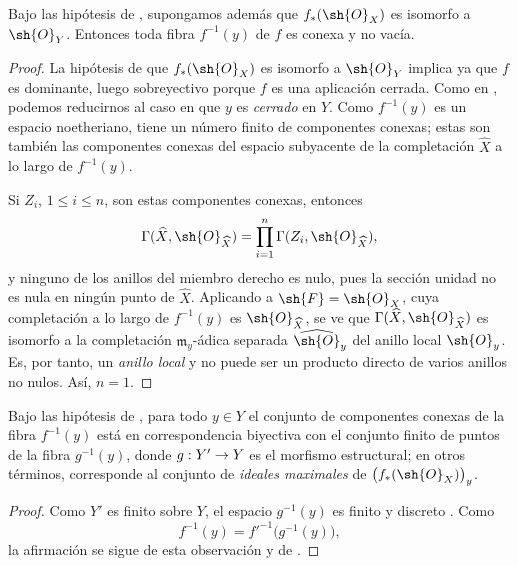 \documentclass[oneside]{amsart}
\makeatletter
\renewcommand{\leq}{\leqslant}
\newcommand{\ega@arrow}[2]{\mathchoice{#1}{#2}{#2}{#2}}
\renewcommand{\to}{\ega@arrow{\longrightarrow}{\rightarrow}}
\let\EGAOriginalLabel\label
\renewcommand{\label}[1]{\phantomsection\EGAOriginalLabel{#1}}
\makeatother
\begin{document}
\begin{corollary}[4.3.2]
\label{III.4.3.2}
Bajo las hipótesis de \textup{}, supongamos además que
$f_*(\sh{O}_X)$ es isomorfo a $\sh{O}_Y$. Entonces toda fibra
$f^{-1}(y)$ de $f$ es conexa y no vacía.
\end{corollary}

\begin{proof}
La hipótesis de que $f_*(\sh{O}_X)$ es isomorfo a $\sh{O}_Y$ implica
ya que $f$ es dominante, luego sobreyectivo porque $f$ es una
aplicación cerrada. Como en , podemos reducirnos al
caso en que $y$ es \emph{cerrado} en $Y$. Como $f^{-1}(y)$ es un espacio
noetheriano, tiene un número finito de componentes conexas; estas son
también las componentes conexas del espacio subyacente de la
completación $\widehat{X}$ a lo largo de $f^{-1}(y)$.

Si $Z_i$, $1\leq i\leq n$, son estas componentes conexas, entonces
\[
  \Gamma(\widehat{X},\sh{O}_{\widehat{X}})
  =
  \prod_{i=1}^{n}\Gamma(Z_i,\sh{O}_{\widehat{X}}),
\]
y ninguno de los anillos del miembro derecho es nulo, pues la sección
unidad no es nula en ningún punto de $\widehat{X}$. Aplicando
 a $\sh{F}=\sh{O}_X$, cuya completación a lo largo de
$f^{-1}(y)$ es $\sh{O}_{\widehat{X}}$, se ve que
$\Gamma(\widehat{X},\sh{O}_{\widehat{X}})$ es isomorfo a la
completación $\mathfrak{m}_y$-ádica separada
$\widehat{\sh{O}}_y$ del anillo local $\sh{O}_y$. Es, por tanto, un
\emph{anillo local} y no puede ser un producto directo de varios anillos no
nulos. Así, $n=1$.
\end{proof}

\begin{corollary}[4.3.3]
\label{III.4.3.3}
Bajo las hipótesis de \textup{}, para todo $y\in Y$ el conjunto
de componentes conexas de la fibra $f^{-1}(y)$ está en correspondencia
biyectiva con el conjunto finito de puntos de la fibra
$g^{-1}(y)$, donde $g:Y'\to Y$ es el morfismo estructural; en otros
términos, corresponde al conjunto de \emph{ideales maximales} de
$\bigl(f_*(\sh{O}_X)\bigr)_y$.
\end{corollary}

\begin{proof}
Como $Y'$ es finito sobre $Y$, el espacio $g^{-1}(y)$ es finito y
discreto . Como
\[
  f^{-1}(y)=f'^{-1}\bigl(g^{-1}(y)\bigr),
\]
la afirmación se sigue de esta observación y de
.
\end{proof}
\end{document}
